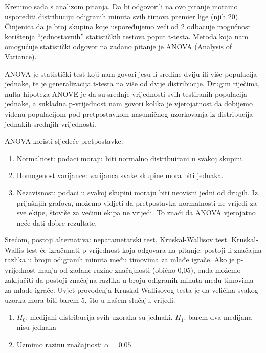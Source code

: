 \documentclass[
]{article}
\providecommand{\tightlist}{%
  \setlength{\itemsep}{0pt}\setlength{\parskip}{0pt}}
\begin{document}
Krenimo sada s analizom pitanja. Da bi odgovorili na ovo pitanje moramo
usporediti distribuciju odigranih minuta svih timova premier lige (njih
20). Činjenica da je broj skupina koje uspoređujemo veći od 2 odbacuje
mogućnost korištenja ``jednostavnih'' statističkih testova poput
t-testa. Metoda koja nam omogućuje statistički odgovor na zadano pitanje
je ANOVA (Analysis of Variance).

ANOVA je statistički test koji nam govori jesu li sredine dviju ili više
populacija jednake, te je generalizacija t-testa na više od dvije
distribucije. Drugim riječima, nulta hipoteza ANOVE je da su srednje
vrijednosti svih testiranih populacija jednake, a sukladna p-vrijednost
nam govori kolika je vjerojatnost da dobijemo viđenu populacijom pod
pretpostavkom nasumičnog uzorkovanja iz distribucija jednakih srednjih
vrijednosti.

ANOVA koristi sljedeće pretpostavke:

\begin{enumerate}
\def\labelenumi{\arabic{enumi}.}
\tightlist
\item
  Normalnost: podaci moraju biti normalno distribuirani u svakoj
  skupini.
\item
  Homogenost varijance: varijanca svake skupine mora biti jednaka.
\item
  Nezavisnost: podaci u svakoj skupini moraju biti neovisni jedni od
  drugih. Iz prijašnjih grafova, možemo vidjeti da pretpostavka
  normalnosti ne vrijedi za sve ekipe, štoviše za većinu ekipa ne
  vrijedi. To znači da ANOVA vjerojatno neće dati dobre rezultate.
\end{enumerate}

Srećom, postoji alternativa: neparametarski test, Kruskal-Wallisov test.
Kruskal-Wallis test će izračunati p-vrijednost koja odgovara na pitanje:
postoji li značajna razlika u broju odigranih minuta među timovima za
mlađe igrače. Ako je p-vrijednost manja od zadane razine značajnosti
(obično 0,05), onda možemo zaključiti da postoji značajna razlika u
broju odigranih minuta među timovima za mlađe igrače. Uvjet provođenja
Kruskal-Wallisovog testa je da veličina svakog uzorka mora biti barem 5,
što u našem slučaju vrijedi.

\begin{enumerate}
\def\labelenumi{\arabic{enumi}.}
\tightlist
\item
  \(H_0\): medijani distribucija svih uzoraka su jednaki. \(H_1\): barem
  dva medijana nisu jednaka
\item
  Uzmimo razinu značajnosti \(\alpha = 0.05\).
\end{enumerate}
\end{document}
